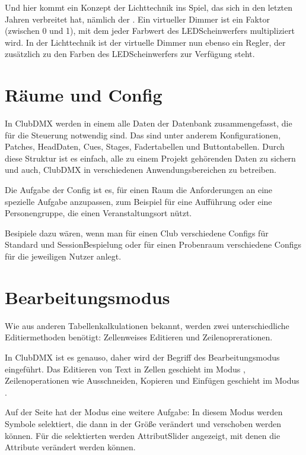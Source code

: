 \documentclass[letterpaper,10pt,ngerman]{sphinxmanual}
\begin{document}
Und hier kommt ein Konzept der Lichttechnik ins Spiel, das sich
in den letzten Jahren verbreitet hat, nämlich der .
Ein virtueller Dimmer ist ein Faktor (zwischen 0 und 1),
mit dem jeder Farbwert des LED\sphinxhyphen{}Scheinwerfers multipliziert wird.
In der Lichttechnik ist der virtuelle Dimmer nun ebenso ein Regler,
der zusätzlich zu den Farben des LED\sphinxhyphen{}Scheinwerfers zur Verfügung steht.


\section{Räume und Config}
\label{\detokenize{grundlagen:raume-und-config}}\label{\detokenize{grundlagen:raum-config-label}}
In ClubDMX werden in einem  alle Daten der Datenbank zusammengefasst, die
für die Steuerung notwendig sind. Das sind unter anderem Konfigurationen,
Patches, Head\sphinxhyphen{}Daten, Cues, Stages, Fadertabellen und Buttontabellen.
Durch diese Struktur ist es einfach, alle zu einem Projekt gehörenden Daten
zu sichern und auch, ClubDMX in verschiedenen Anwendungsbereichen zu betreiben.

Die Aufgabe der Config ist es, für einen Raum die Anforderungen an eine spezielle
Aufgabe anzupassen, zum Beispiel für eine Aufführung oder eine
Personengruppe, die einen Veranstaltungsort nützt.

Besipiele dazu wären, wenn man für einen Club verschiedene Configs für
Standard\sphinxhyphen{} und Session\sphinxhyphen{}Bespielung oder für einen Probenraum verschiedene
Configs für die jeweiligen Nutzer anlegt.


\section{Bearbeitungsmodus}
\label{\detokenize{grundlagen:bearbeitungsmodus}}\label{\detokenize{grundlagen:bearbeitungsmoduslabel}}
Wie aus anderen Tabellenkalkulationen bekannt, werden zwei unterschiedliche
Editiermethoden benötigt: Zellenweises Editieren und Zeilenoprerationen.

In ClubDMX ist es genauso, daher wird der Begriff des Bearbeitungsmodus
eingeführt. Das Editieren von Text in Zellen geschieht im Modus ,
Zeilenoperationen wie Ausschneiden, Kopieren und Einfügen geschieht im
Modus .

Auf der \sphinxhyphen{}Seite hat der Modus  eine weitere Aufgabe:
In diesem Modus werden Symbole selektiert,
die dann in der Größe verändert und verschoben
werden können. Für die selektierten  werden Attribut\sphinxhyphen{}Slider
angezeigt, mit denen die Attribute verändert werden können.
\end{document}

